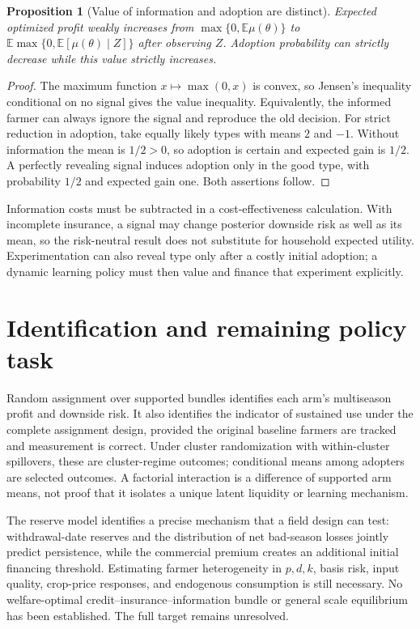\documentclass[11pt]{article}
\newtheorem{proposition}[theorem]{Proposition}
\theoremstyle{remark}
\newcommand{\E}{\mathbb E}
\begin{document}
\begin{proposition}[Value of information and adoption are distinct]
Expected optimized profit weakly increases from
$\max\{0,\E\mu(\theta)\}$ to
$\E\max\{0,\E[\mu(\theta)\mid Z]\}$ after observing $Z$. Adoption probability can strictly decrease while this value strictly increases.
\end{proposition}
\begin{proof}
The maximum function $x\mapsto\max(0,x)$ is convex, so Jensen's inequality conditional on no signal gives the value inequality. Equivalently, the informed farmer can always ignore the signal and reproduce the old decision. For strict reduction in adoption, take equally likely types with means $2$ and $-1$. Without information the mean is $1/2>0$, so adoption is certain and expected gain is $1/2$. A perfectly revealing signal induces adoption only in the good type, with probability $1/2$ and expected gain one. Both assertions follow.
\end{proof}

Information costs must be subtracted in a cost-effectiveness calculation. With incomplete insurance, a signal may change posterior downside risk as well as its mean, so the risk-neutral result does not substitute for household expected utility. Experimentation can also reveal type only after a costly initial adoption; a dynamic learning policy must then value and finance that experiment explicitly.

\section{Identification and remaining policy task}
Random assignment over supported bundles identifies each arm's multiseason profit and downside risk. It also identifies the indicator of sustained use under the complete assignment design, provided the original baseline farmers are tracked and measurement is correct. Under cluster randomization with within-cluster spillovers, these are cluster-regime outcomes; conditional means among adopters are selected outcomes. A factorial interaction is a difference of supported arm means, not proof that it isolates a unique latent liquidity or learning mechanism.

The reserve model identifies a precise mechanism that a field design can test: withdrawal-date reserves and the distribution of net bad-season losses jointly predict persistence, while the commercial premium creates an additional initial financing threshold. Estimating farmer heterogeneity in $p,d,k$, basis risk, input quality, crop-price responses, and endogenous consumption is still necessary. No welfare-optimal credit--insurance--information bundle or general scale equilibrium has been established. The full target remains unresolved.
\end{document}
